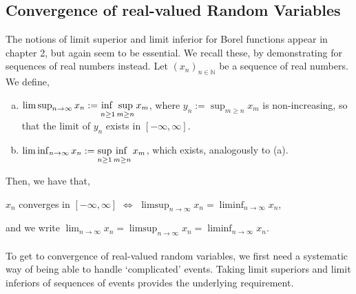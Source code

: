 \documentclass{article}
\begin{document}
\subsection{Convergence of real-valued Random Variables}
The notions of limit superior and limit inferior for Borel functions appear in chapter 2, but again seem to be essential. We recall these, by demonstrating for sequences of real numbers instead. Let $(x_n)_{n \in \mathbb{N}}$ be a sequence of real numbers. We define,
\begin{enumerate}[(a)]
	\item $\limsup_{n\to\infty}x_n := \adjustlimits{\inf}_{n \geq1}{\sup}_{m \geq n} x_m$, where $y_n := \sup_{m \geq n} x_m$ is non-increasing, so that the limit of $y_n$ exists in $[-\infty,\infty]$.
	\item $\liminf_{n\to\infty}x_n := \adjustlimits\sup_{n \geq 1}\inf_{m \geq n} x_m$, which exists, analogously to (a).
\end{enumerate}
Then, we have that,
\begin{center}
	$x_n$ converges in $[-\infty, \infty]$ $\iff$ $\limsup_{n\to\infty}x_n = \liminf_{n\to\infty}x_n$,
\end{center}
and we write $\lim_{n\to\infty}x_n = \limsup_{n\to\infty}x_n = \liminf_{n\to\infty}x_n$.\\\\
To get to convergence of real-valued random variables, we first need a systematic way of being able to handle ‘complicated’ events. Taking limit superiors and limit inferiors of sequences of events provides the underlying requirement.\\\\
\noindent{}\\\\
\end{document}
